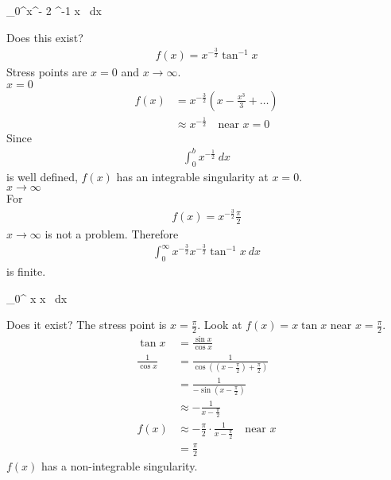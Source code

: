  
 \begin{nex}
 	\item
 	\begin{itemal}
 		\int_0^\infty x^{- 2} \tan^{-1} x ~dx
 	\end{itemal}
 	Does this exist?
 	\begin{align*}
 	f(x) = x^{-\frac 3 2} \tan^{-1} x
 	\end{align*}
 	Stress points are $x=0$ and $x \to \infty$. \\
 	$x=0$ 
 	\begin{align*}
 	f(x) & = x^{-\frac 3 2} \left(x-\frac {x^3} 3+\dots \right) \\
 	& \approx x^{-\frac 1 2} \quad \text{near } x= 0
 	\end{align*}
 	Since
 	\begin{align*}
 	\int_0^b x^{-\frac 1 2} ~dx
 	\end{align*}
 	is well defined, $f(x)$ has an integrable singularity at $x=0$. \\
 	$x \to \infty$ \\
 	For
 	\begin{align*}
 	f(x) = x^{-\frac 3 2} \frac \pi 2
 	\end{align*}
 	$x \to\infty$ is not a problem. Therefore 
 	\begin{align*}
 	\int_0^\infty x^{-\frac 3 2} x^{-\frac 3 2} \tan^{-1} x ~dx
 	\end{align*}
 	is finite.
 	\item
 	\begin{itemal}
 		\int_0^{\frac {}} x \tan x ~dx
 	\end{itemal}
 	Does it exist? The stress point is $x = \frac \pi 2$. Look at $f(x) = x \tan x$ near $x = \frac \pi 2$.
 	\begin{align*}
 	\tan x & = \frac{\sin x}{\cos x} \\
 	\frac 1 {\cos x} & = \frac 1 {\cos((x-\frac \pi 2) + \frac \pi 2)} \\
 	& = \frac 1 {-\sin(x - \frac \pi 2)} \\
 	& \approx - \frac 1 {x-\frac \pi 2} \\
 	f(x) & \approx - \frac \pi 2 \cdot \frac 1 {x-\frac \pi 2} \quad \text{near } x  \\
 	& =\frac \pi 2
 	\end{align*}
 	$f(x)$ has a non-integrable singularity.
 	

\end{nex}
